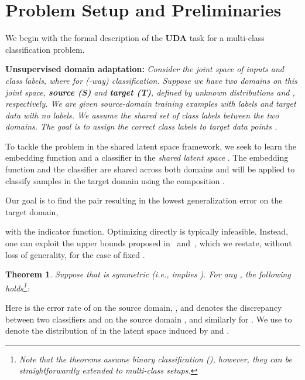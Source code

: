 \documentclass[10pt,letterpaper]{article}
\newtheorem{theorem1}{Theorem}
\begin{document}
\section{Problem Setup and Preliminaries}\label{sec:setup}

We begin with the formal description of the \textbf{UDA} task for a multi-class classification problem. 

\textbf{Unsupervised domain adaptation:} {\em Consider the joint space of inputs and class labels,  where  for (-way) classification. Suppose we have two domains on this joint space, \textbf{source (S)} and \textbf{target (T)}, defined by unknown distributions  and , respectively.  We are given source-domain training examples with labels  and target data  with no labels.  We assume the shared set of class labels between the two domains. The goal is to assign the correct class labels  to target data points .}

To tackle the problem in the shared latent space framework, we seek to learn the embedding function  and a classifier  in the \textit{shared latent space} . The embedding function  and the classifier  are shared across both domains and will be applied to classify samples in the target domain using the composition .  

Our goal is to find the pair  resulting in the lowest generalization error on the target domain, 
\vspace{+0.5em}

with  the  indicator function.  Optimizing  directly is typically infeasible.  Instead, one can exploit the upper bounds proposed in~\cite{ben-david-2010} and~\cite{ben-david-2007}, which we restate, without loss of generality, for the case of fixed . 
 











\begin{theorem1}\label{theorem}\cite{ben-david-2010,ben-david-2007}
Suppose that  is symmetric (i.e.,   implies ). For any , the following holds\footnote{Note that the theorems assume binary classification (), however, they can be straightforwardly extended to multi-class setups.}:
\vspace{+0.3em}


\end{theorem1}
Here  is the error rate of  on the source domain, , and  denotes the discrepancy between two classifiers  and  on the source domain , and similarly for .  We use  to denote the distribution of  in the latent space induced by  and .
\end{document}
